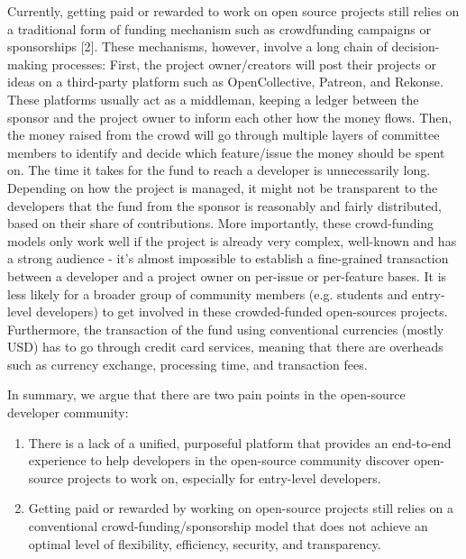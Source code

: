\documentclass[12pt]{article}
\renewcommand{\_}{\kern-1.5pt\textunderscore\kern-1.5pt}
\begin{document}
\begin{enumerate}
        Currently, getting paid or rewarded to work on open source projects still relies on a traditional form of funding mechanism such as crowdfunding campaigns or sponsorships [2]. These mechanisms, however, involve a long chain of decision-making processes: First, the project owner/creators will post their projects or ideas on a third-party platform such as OpenCollective, Patreon, and Rekonse. These platforms usually act as a middleman, keeping a ledger between the sponsor and the project owner to inform each other how the money flows. Then, the money raised from the crowd will go through multiple layers of committee members to identify and decide which feature/issue the money should be spent on. The time it takes for the fund to reach a developer is unnecessarily long. Depending on how the project is managed, it might not be transparent to the developers that the fund from the sponsor is reasonably and fairly distributed, based on their share of contributions. More importantly, these crowd-funding models only work well if the project is already very complex, well-known and has a strong audience - it’s almost impossible to establish a fine-grained transaction between a developer and a project owner on per-issue or per-feature bases. It is less likely for a broader group of community members (e.g. students and entry-level developers) to get involved in these crowded-funded open-sources projects. Furthermore, the transaction of the fund using conventional currencies (mostly USD) has to go through credit card services, meaning that there are overheads such as currency exchange, processing time, and transaction fees.\par
        
        In summary, we argue that there are two pain points in the open-source developer community:
        
        \begin{enumerate}
        \item There is a lack of a unified, purposeful platform that provides an end-to-end experience to help developers in the open-source community discover open-source projects to work on, especially for entry-level developers. \par

        \item Getting paid or rewarded by working on open-source projects still relies on a conventional crowd-funding/sponsorship model that does not achieve an optimal level of flexibility, efficiency, security, and transparency. \par
        

\end{enumerate}
\end{enumerate}
\end{document}
